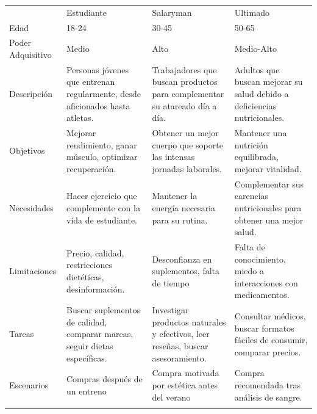 \documentclass[11pt,a4paper]{report}
\begin{document}

\begin{table}[h]
    \centering
    \small
    \renewcommand{\arraystretch}{1.5} %
    \begin{tabular}{!{\color{black}\vrule} >{\centering\arraybackslash{}\selectfont}p{3cm} !{\color{black}\vrule} >{\centering\arraybackslash{}}p{4cm} !{\color{black}\vrule} >{\centering\arraybackslash{}}p{4cm} !{\color{black}\vrule} >{\centering\arraybackslash{}}p{4cm} !{\color{black}\vrule}}
     & {\selectfont\color{white} Estudiante} & {\selectfont\color{white} Salaryman} & {\selectfont\color{white} Ultimado} \\
    \noalign{\hrule} %
    Edad & 18-24 & 30-45 & 50-65 \\
    \noalign{\hrule} %
    Poder Adquisitivo & Medio & Alto & Medio-Alto \\
    \noalign{\hrule} %
    Descripción & Personas jóvenes que entrenan regularmente, desde aficionados hasta atletas. & Trabajadores que buscan productos para complementar su atareado día a día. & Adultos que buscan mejorar su salud debido a deficiencias nutricionales. \\
    \noalign{\hrule} %
    Objetivos & Mejorar rendimiento, ganar músculo, optimizar recuperación. & Obtener un mejor cuerpo que soporte las intensas jornadas laborales. & Mantener una nutrición equilibrada, mejorar vitalidad. \\
    \noalign{\hrule} %
    Necesidades & Hacer ejercicio que complemente con la vida de estudiante. & Mantener la energía necesaria para su rutina. & Complementar sus carencias nutricionales para obtener una mejor salud. \\
    \noalign{\hrule} %
    Limitaciones & Precio, calidad, restricciones dietéticas, desinformación. & Desconfianza en suplementos, falta de tiempo & Falta de conocimiento, miedo a interacciones con medicamentos. \\
    \noalign{\hrule} %
    Tareas & Buscar suplementos de calidad, comparar marcas, seguir dietas específicas. & Investigar productos naturales y efectivos, leer reseñas, buscar asesoramiento. & Consultar médicos, buscar formatos fáciles de consumir, comparar precios. \\
    \noalign{\hrule} %
    Escenarios & Compras después de un entreno & Compra motivada por estética antes del verano & Compra recomendada tras análisis de sangre. \\
    \end{tabular}
\end{table}
\end{document}
